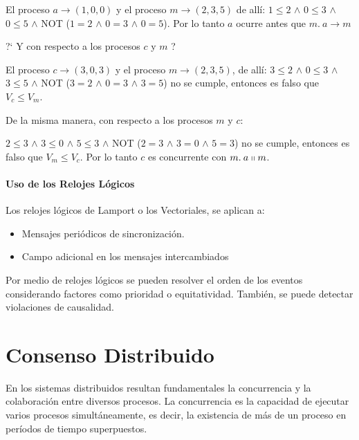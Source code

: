 El proceso $a \rightarrow (1,0,0) $  y el proceso $m \rightarrow (2,3,5)$ de all\'i: $1 \leq 2 $ \:$\land$\:  $0 \leq 3 $  \:$\land$\:  $0 \leq 5 $ \:  $\land$  \: NOT ($1 = 2 $ \:$\land$\:  $0 = 3 $  \: $\land$\:  $0 = 5 $). Por lo tanto $a$ ocurre antes que $m. \:  a \rightarrow m$

?` Y con respecto a los procesos  $c$ y $m$ ?


El proceso $c \rightarrow (3,0,3) $  y el proceso $m \rightarrow (2,3,5)$,  de all\'i: $3 \leq 2 $ \:$\land$\:  $0 \leq 3 $  \:$\land$\:  $3 \leq 5 $ \:  $\land$  \: NOT ($3 = 2 $ \:$\land$\:  $0 = 3 $  \: $\land$\:  $3 = 5 $) no se cumple, entonces  es falso que $ V_{c} \leq  V_{m} $. 


De la misma manera, con respecto a los procesos $m $ y $c$:
 
 $2 \leq 3 $ \:$\land$\:  $3 \leq 0 $  \:$\land$\:  $5 \leq 3 $ \:  $\land$  \: NOT ($2 = 3 $ \:$\land$\:  $3 = 0 $  \: $\land$\:  $5 = 3 $) no se cumple,  entonces es falso que  $ V_{m} \leq  V_{c} $.
Por lo tanto $c$ es concurrente con $m. \: a\shortparallel m$.  
  
				
				
	\paragraph{Uso de los Relojes Lógicos}
	Los  relojes lógicos de Lamport o los  Vectoriales, se  aplican a:
    \begin{itemize}
    	\item 	Mensajes periódicos de sincronización.
		\item Campo adicional en los mensajes intercambiados
	 \end{itemize}
	Por medio de relojes lógicos se pueden resolver el orden de los  eventos  considerando factores como  prioridad o
	equitatividad.	Tambi\'en, se puede detectar violaciones de causalidad.
\section{Consenso Distribuido}


	En los sistemas distribuidos resultan fundamentales la concurrencia y la colaboración entre diversos 	procesos. La \gls{concurrencia} es la capacidad de ejecutar varios procesos simultáneamente, es decir, la existencia de más de un proceso en  períodos de tiempo superpuestos.
	

